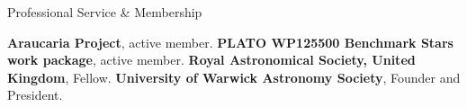 \begin{rubric}{Professional Service \& Membership}

\entry*[2023 -- ~~~~~\,\,\,~~~]%
    \textbf{Araucaria Project}, active member.
\entry*[2018 -- ~~~~~\,\,\,~~~]%
    \textbf{PLATO WP125500 Benchmark Stars work package}, active member.
\entry*[2016 -- ~~~~~\,\,\,~~~]%
    \textbf{Royal Astronomical Society, United Kingdom}, Fellow.
\entry*[2016 -- 2018]%
    \textbf{University of Warwick Astronomy Society}, Founder and President. %






\end{rubric}